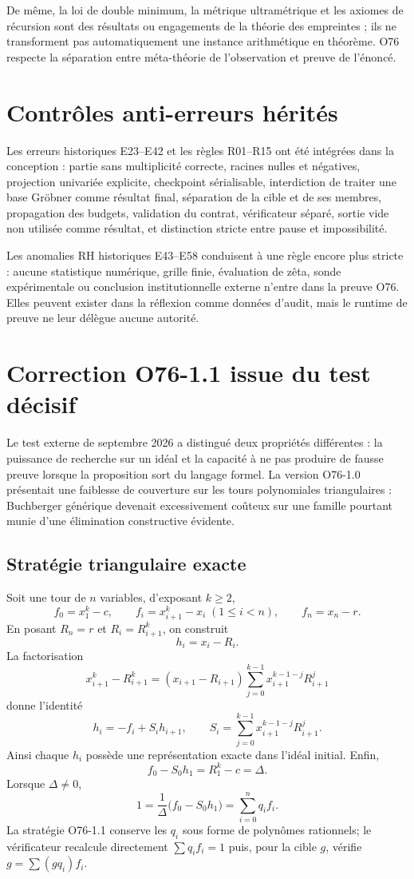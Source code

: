 \documentclass[11pt,a4paper]{article}
\begin{document}
De même, la loi de double minimum, la métrique ultramétrique et les axiomes de récursion sont des résultats ou engagements de la théorie des empreintes ; ils ne transforment pas automatiquement une instance arithmétique en théorème. O76 respecte la séparation entre méta-théorie de l'observation et preuve de l'énoncé.

\section{Contrôles anti-erreurs hérités}
Les erreurs historiques E23--E42 et les règles R01--R15 ont été intégrées dans la conception : partie sans multiplicité correcte, racines nulles et négatives, projection univariée explicite, checkpoint sérialisable, interdiction de traiter une base Gröbner comme résultat final, séparation de la cible et de ses membres, propagation des budgets, validation du contrat, vérificateur séparé, sortie vide non utilisée comme résultat, et distinction stricte entre pause et impossibilité.

Les anomalies RH historiques E43--E58 conduisent à une règle encore plus stricte : aucune statistique numérique, grille finie, évaluation de zêta, sonde expérimentale ou conclusion institutionnelle externe n'entre dans la preuve O76. Elles peuvent exister dans la réflexion comme données d'audit, mais le runtime de preuve ne leur délègue aucune autorité.

\section{Correction O76-1.1 issue du test décisif}
Le test externe de septembre 2026 a distingué deux propriétés différentes : la puissance de recherche sur un idéal et la capacité à ne pas produire de fausse preuve lorsque la proposition sort du langage formel. La version O76-1.0 présentait une faiblesse de couverture sur les tours polynomiales triangulaires : Buchberger générique devenait excessivement coûteux sur une famille pourtant munie d'une élimination constructive évidente.

\subsection{Stratégie triangulaire exacte}
Soit une tour de $n$ variables, d'exposant $k\ge2$,
\[
f_0=x_1^k-c,\qquad f_i=x_{i+1}^k-x_i\;(1\le i<n),\qquad f_n=x_n-r.
\]
En posant $R_n=r$ et $R_i=R_{i+1}^k$, on construit
\[
h_i=x_i-R_i.
\]
La factorisation
\[
x_{i+1}^k-R_{i+1}^k=(x_{i+1}-R_{i+1})\sum_{j=0}^{k-1}x_{i+1}^{k-1-j}R_{i+1}^{j}
\]
donne l'identité
\[
h_i=-f_i+S_i h_{i+1},\qquad S_i=\sum_{j=0}^{k-1}x_{i+1}^{k-1-j}R_{i+1}^{j}.
\]
Ainsi chaque $h_i$ possède une représentation exacte dans l'idéal initial. Enfin,
\[
f_0-S_0h_1=R_1^k-c=\Delta.
\]
Lorsque $\Delta\ne0$,
\[
1=\frac1\Delta\bigl(f_0-S_0h_1\bigr)=\sum_{i=0}^{n}q_i f_i.
\]
La stratégie O76-1.1 conserve les $q_i$ sous forme de polynômes rationnels; le vérificateur recalcule directement $\sum q_i f_i=1$ puis, pour la cible $g$, vérifie $g=\sum (gq_i)f_i$.
\end{document}
